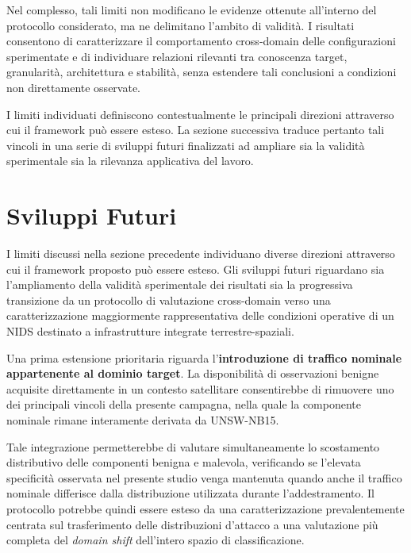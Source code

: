 Nel complesso, tali limiti non modificano le evidenze ottenute all'interno del protocollo considerato, ma ne delimitano l'ambito di validità.
I risultati consentono di caratterizzare il comportamento cross-domain delle configurazioni sperimentate e di individuare relazioni rilevanti tra conoscenza target, granularità, architettura e stabilità, senza estendere tali conclusioni a condizioni non direttamente osservate.

I limiti individuati definiscono contestualmente le principali direzioni attraverso cui il framework può essere esteso.
La sezione successiva traduce pertanto tali vincoli in una serie di sviluppi futuri finalizzati ad ampliare sia la validità sperimentale sia la rilevanza applicativa del lavoro.




\section{Sviluppi Futuri}
\label{sec:sviluppi_futuri}

I limiti discussi nella sezione precedente individuano diverse direzioni attraverso cui il framework proposto può essere esteso.
Gli sviluppi futuri riguardano sia l'ampliamento della validità sperimentale dei risultati sia la progressiva transizione da un protocollo di valutazione cross-domain verso una caratterizzazione maggiormente rappresentativa delle condizioni operative di un NIDS destinato a infrastrutture integrate terrestre-spaziali.

Una prima estensione prioritaria riguarda l'\textbf{introduzione di traffico nominale appartenente al dominio target}.
La disponibilità di osservazioni benigne acquisite direttamente in un contesto satellitare consentirebbe di rimuovere uno dei principali vincoli della presente campagna, nella quale la componente nominale rimane interamente derivata da UNSW-NB15.

Tale integrazione permetterebbe di valutare simultaneamente lo scostamento distributivo delle componenti benigna e malevola, verificando se l'elevata specificità osservata nel presente studio venga mantenuta quando anche il traffico nominale differisce dalla distribuzione utilizzata durante l'addestramento.
Il protocollo potrebbe quindi essere esteso da una caratterizzazione prevalentemente centrata sul trasferimento delle distribuzioni d'attacco a una valutazione più completa del \textit{domain shift} dell'intero spazio di classificazione.

